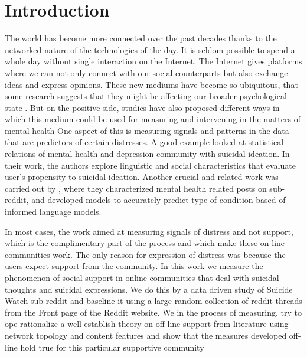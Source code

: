 \section{Introduction}
The world has become more connected over the past decades thanks to the networked nature of the technologies of the day. It is seldom possible to spend a whole day without single interaction on the Internet. The Internet gives platforms where we can not only connect with our social counterparts but also exchange ideas and express opinions. These new mediums have become so ubiquitous, that some research suggests that they might be affecting our broader psychological state \cite{d20122}. But on the positive side, studies have also proposed different ways in which this medium could be used for measuring and intervening in the matters of mental health\cite{DeChoudhury2016,DeChoudhury2014} 
One aspect of this is measuring signals and patterns in the data that are predictors of certain distresses. A good example\cite{DeChoudhury2014,DeChoudhury2016} looked at statistical relations of mental health and depression community with suicidal ideation. In their work, the authors explore linguistic and social characteristics that evaluate user's propensity to suicidal ideation. 
Another crucial and related work was carried out by \cite{gkotsis2017characterisation}, where they characterized mental health related posts on sub-reddit, and developed models to accurately predict type of condition based of informed language models.

In most cases, the work aimed at measuring signals of distress and not support, which is the complimentary part of the process and which make these on-line communities work. The only reason for expression of distress was because the users expect support from the community. In this work we measure the phenomenon of social support in online communities that deal with suicidal thoughts and suicidal expressions. We do this by a data driven study of Suicide Watch sub-reddit and baseline it using a large random collection of reddit threads from the Front page of the Reddit website. We in the process of measuring, try to ope rationalize a well establish theory on off-line support from literature \cite{minkler2005improving} using network topology and content features and show that the measures developed off-line hold true for this particular supportive community

